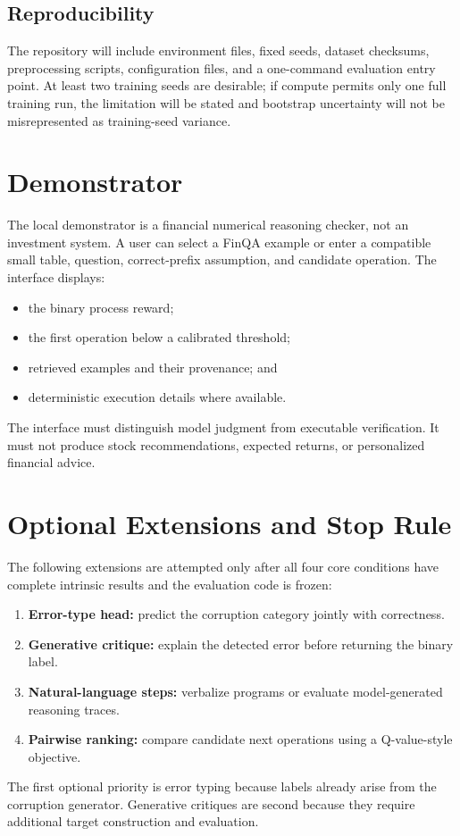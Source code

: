\documentclass[10pt,twocolumn]{article}
\begin{document}
\subsection{Reproducibility}
The repository will include environment files, fixed seeds, dataset checksums, preprocessing scripts, configuration files, and a one-command evaluation entry point. At least two training seeds are desirable; if compute permits only one full training run, the limitation will be stated and bootstrap uncertainty will not be misrepresented as training-seed variance.

\section{Demonstrator}
The local demonstrator is a financial numerical reasoning checker, not an investment system. A user can select a FinQA example or enter a compatible small table, question, correct-prefix assumption, and candidate operation. The interface displays:
\begin{itemize}
  \item the binary process reward;
  \item the first operation below a calibrated threshold;
  \item retrieved examples and their provenance; and
  \item deterministic execution details where available.
\end{itemize}
The interface must distinguish model judgment from executable verification. It must not produce stock recommendations, expected returns, or personalized financial advice.

\section{Optional Extensions and Stop Rule}
The following extensions are attempted only after all four core conditions have complete intrinsic results and the evaluation code is frozen:
\begin{enumerate}
  \item \textbf{Error-type head:} predict the corruption category jointly with correctness.
  \item \textbf{Generative critique:} explain the detected error before returning the binary label.
  \item \textbf{Natural-language steps:} verbalize programs or evaluate model-generated reasoning traces.
  \item \textbf{Pairwise ranking:} compare candidate next operations using a Q-value-style objective.
\end{enumerate}
The first optional priority is error typing because labels already arise from the corruption generator. Generative critiques are second because they require additional target construction and evaluation.
\end{document}
